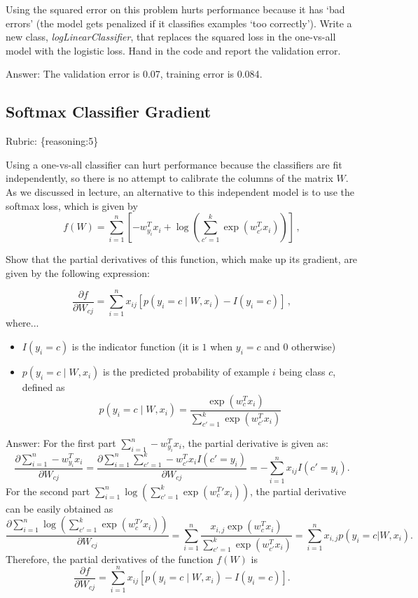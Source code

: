 \documentclass{article}
\def\rubric#1{\gre{Rubric: \{#1\}}}{}
\def\blu#1{{\color{blu}#1}}
\def\gre#1{{\color{gre}#1}}
\begin{document}
Using the squared error on this problem hurts performance because it has `bad errors' (the model gets penalized if it classifies examples `too correctly').
Write a new class, \emph{logLinearClassifier}, that replaces the squared loss in the one-vs-all model with the logistic loss. \blu{Hand in the code and report the validation error}.

\gre{
Answer: The validation error is 0.07, training error is 0.084}.

\subsection{Softmax Classifier Gradient}
\rubric{reasoning:5}

Using a one-vs-all classifier can hurt performance because the classifiers are fit independently, so there is no attempt to calibrate the columns of the matrix $W$. As we discussed in lecture, an alternative to this independent model is to use the softmax loss, which is given by
\[
f(W) = \sum_{i=1}^n \left[-w_{y_i}^Tx_i + \log\left(\sum_{c' = 1}^k \exp(w_{c'}^Tx_i)\right)\right] \, ,
\]

\blu{Show that the partial derivatives of this function, which make up its gradient, are given by the following expression:}

\[
\frac{\partial f}{\partial W_{cj}} = \sum_{i=1}^n x_{ij}[p(y_i=c \mid W,x_i) - I(y_i = c)] \, ,
\]
where...
\begin{itemize}
\item $I(y_i = c)$ is the indicator function (it is $1$ when $y_i=c$ and $0$ otherwise)
\item $p(y_i=c \mid W, x_i)$ is the predicted probability of example $i$ being class $c$, defined as
\[
p(y_i=c \mid W, x_i) = \frac{\exp(w_c^Tx_i)}{\sum_{c'=1}^k\exp(w_{c'}^Tx_i)}
\]

\end{itemize}

\gre{Answer:
For the first part $\sum_{i=1}^n-w^T_{y_i}x_i$, the partial derivative is given as:
\begin{equation}
    \frac{\partial \sum_{i=1}^n -w_{y_i}^Tx_i}{\partial W_{cj}} = \frac{\partial\sum_{i=1}^n \sum_{c'=1}^k-w_{c'}^Tx_iI(c' = y_i)}{\partial W_{cj}} = -\sum_{i=1}^{n}x_{ij}I(c' = y_i).
\end{equation}
For the second part $\sum_{i=1}^n\log{\left(\sum_{c'=1}^k \exp{(w^T_c'x_i)}\right)}$, the partial derivative can be easily obtained as
\begin{equation}
    \frac{\partial \sum_{i=1}^n\log{\left(\sum_{c'=1}^k \exp{(w^T_c'x_i)}\right)}}{\partial W_{cj}} = \sum_{i=1}^n\frac{x_{i,j}\exp{(w^T_cx_i)}}{\sum_{c'=1}^k\exp{(w^T_{c'}x_i)}} = \sum_{i=1}^nx_{i,j}p(y_i=c|W,x_i) .
\end{equation}
Therefore, the partial derivatives of the function $f(W)$ is
\begin{equation}
    \frac{\partial f}{\partial W_{cj}} = \sum_{i=1}^n x_{ij}[p(y_i=c \mid W,x_i) - I(y_i = c)] .
\end{equation}
}
\end{document}
